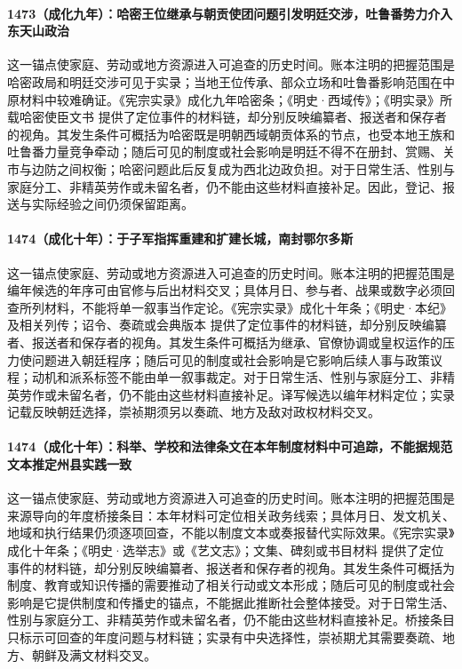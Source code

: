 \paragraph{1473（成化九年）：哈密王位继承与朝贡使团问题引发明廷交涉，吐鲁番势力介入东天山政治} 这一锚点使家庭、劳动或地方资源进入可追查的历史时间。账本注明的把握范围是哈密政局和明廷交涉可见于实录；当地王位传承、部众立场和吐鲁番影响范围在中原材料中较难确证。《宪宗实录》成化九年哈密条；《明史·西域传》；《明实录》所载哈密使臣文书 提供了定位事件的材料链，却分别反映编纂者、报送者和保存者的视角。其发生条件可概括为哈密既是明朝西域朝贡体系的节点，也受本地王族和吐鲁番力量竞争牵动；随后可见的制度或社会影响是明廷不得不在册封、赏赐、关市与边防之间权衡；哈密问题此后反复成为西北边政负担。对于日常生活、性别与家庭分工、非精英劳作或未留名者，仍不能由这些材料直接补足。因此，登记、报送与实际经验之间仍须保留距离。

\paragraph{1474（成化十年）：于子军指挥重建和扩建长城，南封鄂尔多斯} 这一锚点使家庭、劳动或地方资源进入可追查的历史时间。账本注明的把握范围是编年候选的年序可由官修与后出材料交叉；具体月日、参与者、战果或数字必须回查所列材料，不能将单一叙事当作定论。《宪宗实录》成化十年条；《明史·本纪》及相关列传；诏令、奏疏或会典版本 提供了定位事件的材料链，却分别反映编纂者、报送者和保存者的视角。其发生条件可概括为继承、官僚协调或皇权运作的压力使问题进入朝廷程序；随后可见的制度或社会影响是它影响后续人事与政策议程；动机和派系标签不能由单一叙事裁定。对于日常生活、性别与家庭分工、非精英劳作或未留名者，仍不能由这些材料直接补足。译写候选以编年材料定位；实录记载反映朝廷选择，崇祯期须另以奏疏、地方及敌对政权材料交叉。

\paragraph{1474（成化十年）：科举、学校和法律条文在本年制度材料中可追踪，不能据规范文本推定州县实践一致} 这一锚点使家庭、劳动或地方资源进入可追查的历史时间。账本注明的把握范围是来源导向的年度桥接条目：本年材料可定位相关政务线索；具体月日、发文机关、地域和执行结果仍须逐项回查，不能以制度文本或奏报替代实际效果。《宪宗实录》成化十年条；《明史·选举志》或《艺文志》；文集、碑刻或书目材料 提供了定位事件的材料链，却分别反映编纂者、报送者和保存者的视角。其发生条件可概括为制度、教育或知识传播的需要推动了相关行动或文本形成；随后可见的制度或社会影响是它提供制度和传播史的锚点，不能据此推断社会整体接受。对于日常生活、性别与家庭分工、非精英劳作或未留名者，仍不能由这些材料直接补足。桥接条目只标示可回查的年度问题与材料链；实录有中央选择性，崇祯期尤其需要奏疏、地方、朝鲜及满文材料交叉。

